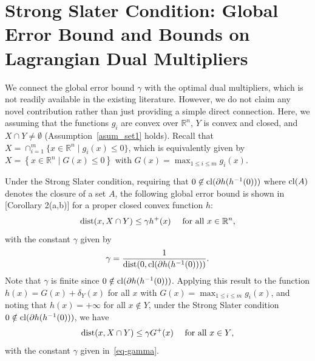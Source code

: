 \documentclass{article}
\def\g{\gamma}
\def\rn{\mathbb{R}^n}
\def\R{\mathbb{R}}
\def\dist{{\rm dist}}
\theoremstyle{plain}
\theoremstyle{definition}
\theoremstyle{remark}
\begin{document}




\newpage
\appendix
\onecolumn


\section{Strong Slater Condition: Global Error Bound and Bounds on Lagrangian Dual Multipliers}\label{app_dul_mul_c_connec}

We connect the global error bound $\g$ with the optimal dual multipliers, which is not readily available in the existing literature. However, we do not claim any novel contribution rather than just providing a simple direct connection.
Here, we assuming that the functions $g_i$ are convex over $\rn$,  $Y$ is convex and closed, and $X\cap Y\ne\emptyset$ (Assumption~\ref{asum_set1} holds). Recall that $X = \cap_{i=1}^m \{ x\in\R^n \mid g_i(x) \leq 0 \}$, which is equivalently given by $X= \left\{ x\in\R^n \mid G(x) \leq 0 \right\}$ with $G(x)=\max_{1\le i\le m} g_i(x)$.

Under the Strong Slater condition, requiring that $0 \not\in {\rm cl}(\partial h(h^{-1}(0)))$ where ${\rm cl}(A)$ denotes the closure of a set $A$, the following global error bound is shown in \cite{lewis1998error} [Corollary 2(a,b)] for a proper closed convex function $h$:
\begin{equation} \label{eq-gammabound}
\dist(x, X \cap Y) \leq \gamma h^+(x) \quad \text{ for all $x \in \R^n$},
\end{equation}
with the constant $\gamma$ given  by
\begin{equation} \label{eq-gamma}
\gamma = \frac{1}{\dist(0, \text{cl}(\partial h(h^{-1}(0))) )}. \end{equation}
Note that $\gamma$ is finite since $0 \notin {\rm cl}(\partial h(h^{-1}(0)))$. 
Applying this result to the function $h(x)=G(x)+\delta_Y(x)$ for all $x$  with $G(x)=\max_{1\le i\le m} g_i(x)$,
and noting that $h(x)=+\infty$ for all $x\notin Y$,  
under the Strong Slater condition $0\notin {\rm cl}(\partial h(h^{-1}(0)))$, we have
\[ \dist(x, X \cap Y) \leq \gamma G^+(x) \quad \text{ for all $x \in Y$},\]
with the constant $\gamma$ given in~\eqref{eq-gamma}.
\end{document}
